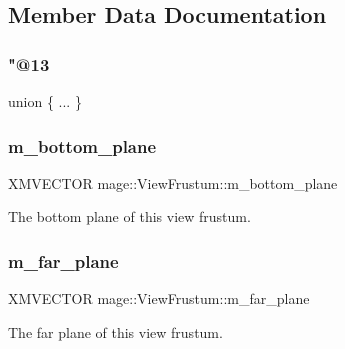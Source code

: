 \subsection{Member Data Documentation}
\hypertarget{structmage_1_1_view_frustum_aeed161a3b8e59ff5d5392051f27b386b}{}\label{structmage_1_1_view_frustum_aeed161a3b8e59ff5d5392051f27b386b} 
\subsubsection{\texorpdfstring{"@13}{@13}}
{\footnotesize\ttfamily union \{ ... \} \hspace{0.3cm}{\ttfamily [private]}}

\hypertarget{structmage_1_1_view_frustum_a66ea2332f1c30b7a1d3ba8f0f0fed347}{}\label{structmage_1_1_view_frustum_a66ea2332f1c30b7a1d3ba8f0f0fed347} 
\subsubsection{\texorpdfstring{m\+\_\+bottom\+\_\+plane}{m\_bottom\_plane}}
{\footnotesize\ttfamily X\+M\+V\+E\+C\+T\+OR mage\+::\+View\+Frustum\+::m\+\_\+bottom\+\_\+plane}

The bottom plane of this view frustum. \hypertarget{structmage_1_1_view_frustum_a02e8a940302c6c2a0d489f0fe35e7f19}{}\label{structmage_1_1_view_frustum_a02e8a940302c6c2a0d489f0fe35e7f19} 
\subsubsection{\texorpdfstring{m\+\_\+far\+\_\+plane}{m\_far\_plane}}
{\footnotesize\ttfamily X\+M\+V\+E\+C\+T\+OR mage\+::\+View\+Frustum\+::m\+\_\+far\+\_\+plane}

The far plane of this view frustum. \hypertarget{structmage_1_1_view_frustum_a07375137f59a785cf123c9feca08d393}{}\label{structmage_1_1_view_frustum_a07375137f59a785cf123c9feca08d393} 
